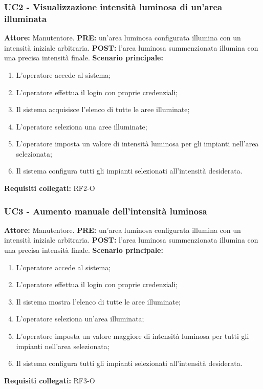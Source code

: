 \documentclass[a4paper, 12pt]{article}
\begin{document}
\subsubsection{UC2 - Visualizzazione intensità luminosa di un'area illuminata}
\textbf{Attore:} Manutentore.\newline
\textbf{PRE:} un'area luminosa configurata illumina con un intensità iniziale arbitraria.\newline
\textbf{POST:} l'area luminosa summenzionata illumina con una precisa intensità finale.\newline
\textbf{Scenario principale:}
\begin{enumerate}
    \item L'operatore accede al sistema;
    \item L'operatore effettua il login con proprie credenziali;
    \item Il sistema acquisisce l'elenco di tutte le aree illuminate;
    \item L'operatore seleziona una aree illuminate;
    \item L'operatore imposta un valore di intensità luminosa per gli impianti nell'area selezionata;
    \item Il sistema configura tutti gli impianti selezionati all'intensità desiderata.
\end{enumerate}
\textbf{Requisiti collegati:} RF2-O\newline



\subsubsection{UC3 - Aumento manuale dell'intensità luminosa}
\textbf{Attore:} Manutentore.\newline
\textbf{PRE:} un'area luminosa configurata illumina con un intensità iniziale arbitraria.\newline
\textbf{POST:} l'area luminosa summenzionata illumina con una precisa intensità finale.\newline
\textbf{Scenario principale:}
\begin{enumerate}
    \item L'operatore accede al sistema;
    \item L'operatore effettua il login con proprie credenziali;
    \item Il sistema mostra l'elenco di tutte le aree illuminate;
    \item L'operatore seleziona un'area illuminata;
    \item L'operatore imposta un valore maggiore di intensità luminosa per tutti gli impianti nell'area selezionata;
    \item Il sistema configura tutti gli impianti selezionati all'intensità desiderata.
\end{enumerate}
\textbf{Requisiti collegati:} RF3-O\newline
\end{document}
